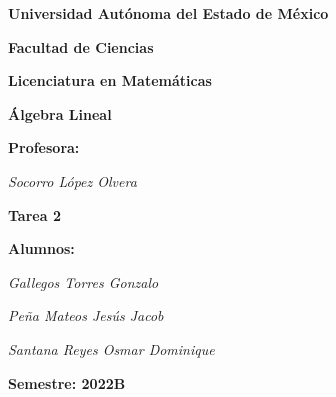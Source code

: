 \documentclass[fleqn]{article}                       %
\begin{document}
    \begin{titlepage}
        \centering
        \vspace{2.7cm}
        {\Huge \textbf{Universidad Autónoma del Estado de México}\par}
        \vspace{0.9cm}

        {\Huge \textbf{Facultad de Ciencias}\par}
        \vspace{0.9cm}

        {\Huge \textbf{Licenciatura en Matemáticas}\par}
        \vspace{1.8cm}

        {\huge \textbf{Álgebra Lineal}\par}
        \vspace{0.7cm}

        {\huge \textbf{Profesora:}\par}
        \vspace{0.3cm}
        {\huge \textsl{Socorro López Olvera}}\par
        \vspace{0.7cm}

        {\huge \textbf{Tarea 2}\par}
        \vspace{0.7cm}

        {\huge \textbf{Alumnos:}\par}
        \vspace{0.3cm}
        {\huge \textsl{Gallegos Torres Gonzalo}}\par
        {\huge \textsl{Peña Mateos Jesús Jacob}}\par
        {\huge \textsl{Santana Reyes Osmar Dominique}}\par
        \vspace{1.8cm}

        {\huge \textbf{Semestre: 2022B}\par}
        \vspace{0.7cm}
        \vfill
        \par         %
    \end{titlepage}
\end{document}
